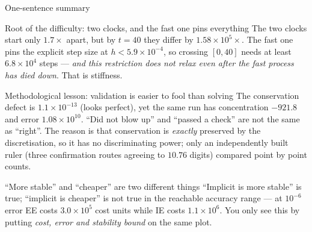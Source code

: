 \documentclass[aspectratio=169,10pt]{beamer}
\begin{document}
\begin{frame}{One-sentence summary}
  \begin{block}{Root of the difficulty: two clocks, and the fast one pins everything}
    The two clocks start only $1.7\times$ apart, but by $t=40$ they differ by
    \alert{$1.58\times10^{5}\times$}.  The fast one pins the explicit step size
    at $h<5.9\times10^{-4}$, so crossing $[0,40]$ needs at least
    $6.8\times10^{4}$ steps --- \emph{and this restriction does not relax even
    after the fast process has died down}.  That is stiffness.
  \end{block}

  \begin{alertblock}{Methodological lesson: validation is easier to fool than solving}
    The conservation defect is $1.1\times10^{-13}$ (looks perfect), yet the same
    run has concentration $-921.8$ and error $1.08\times10^{10}$.  ``Did not
    blow up'' and ``passed a check'' are \alert{not the same as ``right''}.
    The reason is that conservation is \emph{exactly} preserved by the
    discretisation, so it has no discriminating power; only an independently
    built ruler (three confirmation routes agreeing to $10.76$ digits) compared
    point by point counts.
  \end{alertblock}

  \begin{exampleblock}{``More stable'' and ``cheaper'' are two different things}
    ``Implicit is more stable'' is true; ``implicit is cheaper'' is
    \alert{not true} in the reachable accuracy range --- at $10^{-6}$ error EE
    costs $3.0\times10^{5}$ cost units while IE costs $1.1\times10^{6}$.
    You only see this by putting \emph{cost, error and stability bound} on the
    same plot.
  \end{exampleblock}
\end{frame}
\end{document}
